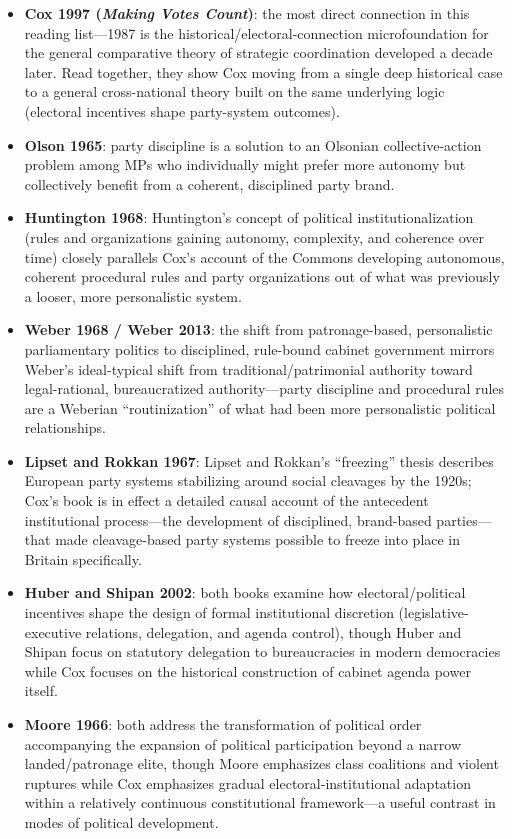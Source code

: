 \documentclass[12pt]{article}
\begin{document}
\begin{itemize}[leftmargin=*, itemsep=4pt]
    \item \textbf{Cox 1997 (\textit{Making Votes Count})}: the most direct connection in this reading list---1987 is the historical/electoral-connection microfoundation for the general comparative theory of strategic coordination developed a decade later. Read together, they show Cox moving from a single deep historical case to a general cross-national theory built on the same underlying logic (electoral incentives shape party-system outcomes).
    \item \textbf{Olson 1965}: party discipline is a solution to an Olsonian collective-action problem among MPs who individually might prefer more autonomy but collectively benefit from a coherent, disciplined party brand.
    \item \textbf{Huntington 1968}: Huntington's concept of political institutionalization (rules and organizations gaining autonomy, complexity, and coherence over time) closely parallels Cox's account of the Commons developing autonomous, coherent procedural rules and party organizations out of what was previously a looser, more personalistic system.
    \item \textbf{Weber 1968 / Weber 2013}: the shift from patronage-based, personalistic parliamentary politics to disciplined, rule-bound cabinet government mirrors Weber's ideal-typical shift from traditional/patrimonial authority toward legal-rational, bureaucratized authority---party discipline and procedural rules are a Weberian ``routinization'' of what had been more personalistic political relationships.
    \item \textbf{Lipset and Rokkan 1967}: Lipset and Rokkan's ``freezing'' thesis describes European party systems stabilizing around social cleavages by the 1920s; Cox's book is in effect a detailed causal account of the antecedent institutional process---the development of disciplined, brand-based parties---that made cleavage-based party systems possible to freeze into place in Britain specifically.
    \item \textbf{Huber and Shipan 2002}: both books examine how electoral/political incentives shape the design of formal institutional discretion (legislative-executive relations, delegation, and agenda control), though Huber and Shipan focus on statutory delegation to bureaucracies in modern democracies while Cox focuses on the historical construction of cabinet agenda power itself.
    \item \textbf{Moore 1966}: both address the transformation of political order accompanying the expansion of political participation beyond a narrow landed/patronage elite, though Moore emphasizes class coalitions and violent ruptures while Cox emphasizes gradual electoral-institutional adaptation within a relatively continuous constitutional framework---a useful contrast in modes of political development.

\end{itemize}
\end{document}
